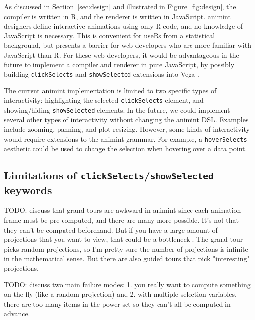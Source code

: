 \documentclass[journal]{vgtc}\usepackage[]{graphicx}\usepackage[]{color}
\begin{document}
As discussed in Section~\ref{sec:design} and illustrated in
Figure~\ref{fig:design}, the compiler is written in R, and the
renderer is written in JavaScript.
animint designers define interactive animations using only R code, and
no knowledge of JavaScript is necessary. This is convenient for useRs
from a statistical background, but presents a barrier for web
developers who are more familiar with JavaScript than R. For these web
developers, it would be advantageous in the future to implement a
compiler and renderer in pure JavaScript, by possibly building
\texttt{clickSelects} and \texttt{showSelected} extensions into Vega
\citep{vega}.

The current animint implementation is limited to two specific types of
interactivity: highlighting the selected \texttt{clickSelects}
element, and showing/hiding \texttt{showSelected} elements. In the
future, we could implement several other types of interactivity
without changing the animint DSL. Examples include zooming,
panning, and plot resizing. However, some
kinds of interactivity would require extensions to the animint
grammar. For example, a \texttt{hoverSelects} aesthetic
could be used to change the selection when hovering over a data point.

\subsection{Limitations of \texttt{clickSelects}/\texttt{showSelected} keywords}

TODO. discuss that grand tours are awkward in animint since each
animation frame must be pre-computed, and there are many more possible.
It's not that they can't be computed beforehand. But if you have a
large amount of projections that you want to view, that could be a
bottleneck \citep{tourr}. The grand tour picks random projections, so
I'm pretty sure the number of projections is infinite in the
mathematical sense. But there are also guided tours that pick
"interesting" projections.

TODO: discuss two main failure modes: 1. you really want to compute
something on the fly (like a random projection) and 2. with multiple
selection variables, there are too many items in the power set so they
can't all be computed in advance.
\end{document}
